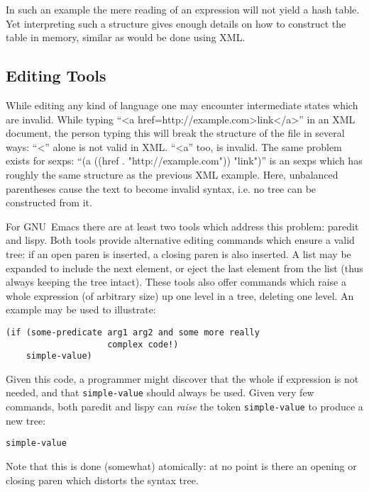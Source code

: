 \documentclass[a4paper,10pt,twoside]{report}
\newcommand{\sym}[1]{\texttt{#1}}
\newcommand{\emacs}{GNU~Emacs}
\begin{document}
In such an example the mere reading of an expression will not yield a hash
table.  Yet interpreting such a structure gives enough details on how to
construct the table in memory, similar as would be done using XML.

\subsection{Editing Tools}
\label{subsec:edit-tools}

While editing any kind of language one may encounter intermediate states which
are invalid.  While typing ``<a href=http://example.com>link</a>'' in an XML
document, the person typing this will break the structure of the file in several
ways:  ``<'' alone is not valid in XML.  ``<a'' too, is invalid.  The same
problem exists for sexps: ``(a ((href . "http://example.com")) "link")'' is an
sexps which has roughly the same structure as the previous XML example.  Here,
unbalanced parentheses cause the text to become invalid syntax, i.e. no tree can
be constructed from it.

For \emacs{} there are at least two tools which address this problem:
paredit\cite{paredit} and lispy\cite{lispy}.  Both tools provide alternative
editing commands which ensure a valid tree:  if an open paren is inserted, a
closing paren is also inserted.  A list may be expanded to include the next
element, or eject the last element from the list (thus always keeping the tree
intact).  These tools also offer commands which raise a whole expression (of
arbitrary size) up one level in a tree, deleting one level.  An example may be
used to illustrate:

\begin{lstlisting}[style=lispinline]
(if (some-predicate arg1 arg2 and some more really
                    complex code!)
    simple-value)
\end{lstlisting}

Given this code, a programmer might discover that the whole if expression is not
needed, and that \sym{simple-value} should always be used.  Given very few
commands, both paredit and lispy can \emph{raise} the token \sym{simple-value}
to produce a new tree:

\begin{lstlisting}[style=lispinline]
simple-value
\end{lstlisting}

Note that this is done (somewhat) atomically: at no point is there an opening or
closing paren which distorts the syntax tree.
\end{document}

